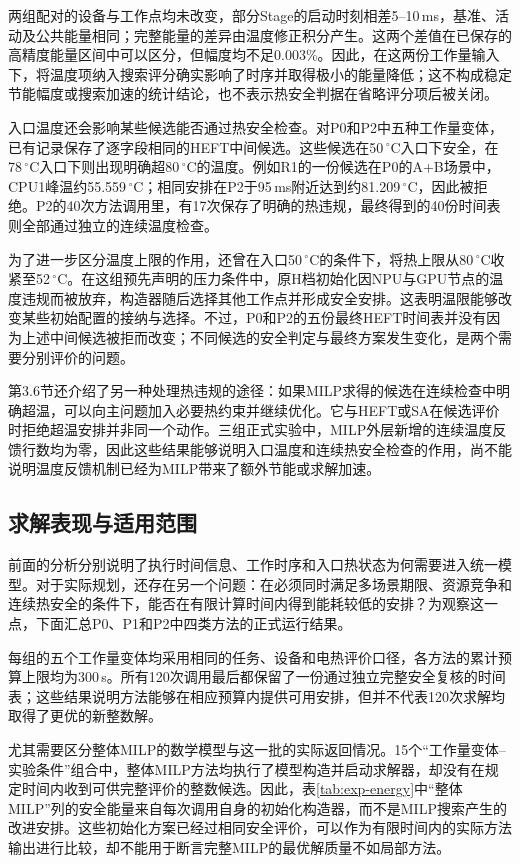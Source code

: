两组配对的设备与工作点均未改变，部分Stage的启动时刻相差5--10\,ms，基准、活动及公共能量相同；完整能量的差异由温度修正积分产生。这两个差值在已保存的高精度能量区间中可以区分，但幅度均不足0.003\%。因此，在这两份工作量输入下，将温度项纳入搜索评分确实影响了时序并取得极小的能量降低；这不构成稳定节能幅度或搜索加速的统计结论，也不表示热安全判据在省略评分项后被关闭。

入口温度还会影响某些候选能否通过热安全检查。对P0和P2中五种工作量变体，已有记录保存了逐字段相同的HEFT中间候选。这些候选在50\,$^\circ$C入口下安全，在78\,$^\circ$C入口下则出现明确超80\,$^\circ$C的温度。例如R1的一份候选在P0的A+B场景中，CPU1峰温约55.559\,$^\circ$C；相同安排在P2于95\,ms附近达到约81.209\,$^\circ$C，因此被拒绝。P2的40次方法调用里，有17次保存了明确的热违规，最终得到的40份时间表则全部通过独立的连续温度检查。

为了进一步区分温度上限的作用，还曾在入口50\,$^\circ$C的条件下，将热上限从80\,$^\circ$C收紧至52\,$^\circ$C。在这组预先声明的压力条件中，原H档初始化因NPU与GPU节点的温度违规而被放弃，构造器随后选择其他工作点并形成安全安排。这表明温限能够改变某些初始配置的接纳与选择。不过，P0和P2的五份最终HEFT时间表并没有因为上述中间候选被拒而改变；不同候选的安全判定与最终方案发生变化，是两个需要分别评价的问题。

第3.6节还介绍了另一种处理热违规的途径：如果MILP求得的候选在连续检查中明确超温，可以向主问题加入必要热约束并继续优化。它与HEFT或SA在候选评价时拒绝超温安排并非同一个动作。三组正式实验中，MILP外层新增的连续温度反馈行数均为零，因此这些结果能够说明入口温度和连续热安全检查的作用，尚不能说明温度反馈机制已经为MILP带来了额外节能或求解加速。



\subsection{求解表现与适用范围}

前面的分析分别说明了执行时间信息、工作时序和入口热状态为何需要进入统一模型。对于实际规划，还存在另一个问题：在必须同时满足多场景期限、资源竞争和连续热安全的条件下，能否在有限计算时间内得到能耗较低的安排？为观察这一点，下面汇总P0、P1和P2中四类方法的正式运行结果。

每组的五个工作量变体均采用相同的任务、设备和电热评价口径，各方法的累计预算上限均为300\,s。所有120次调用最后都保留了一份通过独立完整安全复核的时间表；这些结果说明方法能够在相应预算内提供可用安排，但并不代表120次求解均取得了更优的新整数解。

尤其需要区分整体MILP的数学模型与这一批的实际返回情况。15个“工作量变体--实验条件”组合中，整体MILP方法均执行了模型构造并启动求解器，却没有在规定时间内收到可供完整评价的整数候选。因此，表\ref{tab:exp-energy}中“整体MILP”列的安全能量来自每次调用自身的初始化构造器，而不是MILP搜索产生的改进安排。这些初始化方案已经过相同安全评价，可以作为有限时间内的实际方法输出进行比较，却不能用于断言完整MILP的最优解质量不如局部方法。

